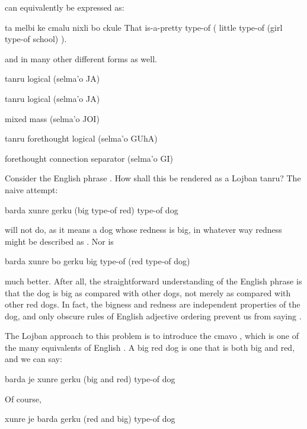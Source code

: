 {\noindent}can equivalently be expressed as:
\begin{example}
ta melbi\n
\T	ke cmalu nixli bo ckule \n
That is-a-pretty\n
\T	type-of ( little type-of (girl type-of school) ).
\end{example}

{\noindent}and in many other different forms as well.



\begin{description}
\item[je] tanru logical  (selma'o JA)
\item[ja] tanru logical  (selma'o JA)
\item[joi] mixed mass  (selma'o JOI)
\item[gu'e] tanru forethought logical  (selma'o GUhA)
\item[gi] forethought connection separator (selma'o GI)
\end{description}
    Consider the English phrase . How shall this be
    rendered as a Lojban tanru? The naive attempt:
\begin{example}
barda xunre gerku\n
(big type-of red) type-of dog
\end{example}

{\noindent}will not do, as it means a dog whose redness is big, in
    whatever way redness might be described as . Nor is
\begin{example}
barda xunre bo gerku\n
big type-of (red type-of dog)
\end{example}

{\noindent}much better. After all, the straightforward understanding of
    the English phrase is that the dog is big as compared with
    other dogs, not merely as compared with other red dogs. In
    fact, the bigness and redness are independent properties of the
    dog, and only obscure rules of English adjective ordering
    prevent us from saying . 

The Lojban approach to this problem is to introduce the
    cmavo , which is one of the many equivalents of English
    . A big red dog is one that is both big and red, and we
    can say:
\begin{example}
barda je xunre gerku\n
(big and red) type-of dog
\end{example}

Of course,
\begin{example}
xunre je barda gerku\n
(red and big) type-of dog
\end{example}

